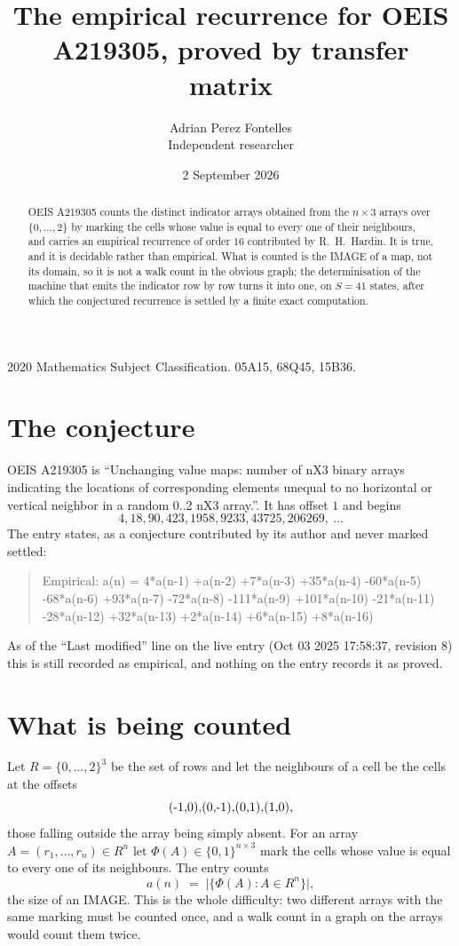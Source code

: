 \documentclass[11pt,a4paper]{article}
\title{The empirical recurrence for OEIS A219305, proved by transfer matrix}
\author{Adrian Perez Fontelles\\ \small Independent researcher}
\date{2 September 2026}
\theoremstyle{plain}
\theoremstyle{definition}
\begin{document}
\maketitle

\begin{abstract}
OEIS A219305 counts the distinct indicator arrays obtained from the $n\times3$ arrays over
$\{0,\dots,2\}$ by marking the cells whose value is equal to every one of their neighbours, and carries an
empirical recurrence of order $16$ contributed by R.~H.~Hardin. It is true, and it is
decidable rather than empirical. What is counted is the IMAGE of a map, not its domain, so it
is not a walk count in the obvious graph; the determinisation of the machine that emits the
indicator row by row turns it into one, on $S=41$ states, after which the conjectured
recurrence is settled by a finite exact computation.
\end{abstract}

\noindent\small 2020 Mathematics Subject Classification. 05A15, 68Q45, 15B36.\normalsize

\section{The conjecture}

OEIS A219305 is ``Unchanging value maps: number of nX3 binary arrays indicating the locations of corresponding elements unequal to no horizontal or vertical neighbor in a random 0..2 nX3 array.''. It has offset $1$ and begins
\[
4, 18, 90, 423, 1958, 9233, 43725, 206269,\ \dots
\]
The entry states, as a conjecture contributed by its author and never marked settled:
\begin{quote}
Empirical: a(n) = 4*a(n-1) +a(n-2) +7*a(n-3) +35*a(n-4) -60*a(n-5) -68*a(n-6) +93*a(n-7) -72*a(n-8) -111*a(n-9) +101*a(n-10) -21*a(n-11) -28*a(n-12) +32*a(n-13) +2*a(n-14) +6*a(n-15) +8*a(n-16)
\end{quote}
As of the ``Last modified'' line on the live entry (Oct 03 2025 17:58:37, revision 8) this is still
recorded as empirical, and nothing on the entry records it as proved.

\section{What is being counted}

Let $R=\{0,\dots,2\}^{3}$ be the set of rows and let the neighbours of a cell be the
cells at the offsets
\[
$(-1,0)$, $(0,-1)$, $(0,1)$, $(1,0)$,
\]
those falling outside the array being simply absent. For an array
$A=(r_1,\dots,r_n)\in R^n$ let $\Phi(A)\in\{0,1\}^{n\times3}$ mark the cells whose value
is equal to every one of its neighbours. The entry counts
\[
a(n)\;=\;\bigl|\{\Phi(A):A\in R^n\}\bigr| ,
\]
the size of an IMAGE. This is the whole difficulty: two different arrays with the same marking
must be counted once, and a walk count in a graph on the arrays would count them twice.
\end{document}
